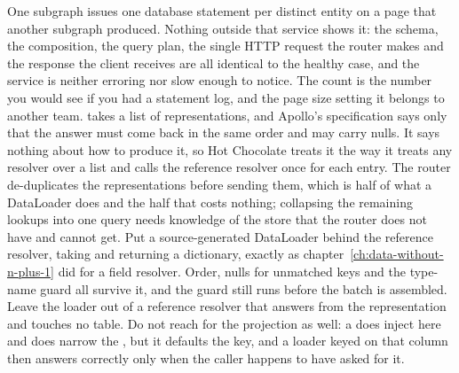 \begin{problemsummary}
{One subgraph issues one database statement per distinct entity on a page that
another subgraph produced. Nothing outside that service shows it: the schema,
the composition, the query plan, the single HTTP request the router makes and
the response the client receives are all identical to the healthy case, and the
service is neither erroring nor slow enough to notice. The count is the number
you would see if you had a statement log, and the page size setting it belongs
to another team.}
{ takes a list of representations, and Apollo's specification
says only that the answer must come back in the same order and may carry nulls.
It says nothing about how to produce it, so Hot Chocolate treats it the way it
treats any resolver over a list and calls the reference resolver once for each
entry. The router de-duplicates the representations before sending them, which
is half of what a DataLoader does and the half that costs nothing; collapsing
the remaining lookups into one query needs knowledge of the store that the
router does not have and cannot get.}
{Put a source-generated DataLoader behind the reference resolver, taking
 and returning a dictionary, exactly as
chapter~\ref{ch:data-without-n-plus-1} did for a field resolver. Order, nulls
for unmatched keys and the type-name guard all survive it, and the guard still
runs before the batch is assembled. Leave the loader out of a reference resolver
that answers from the representation and touches no table. Do not reach for the
projection as well: a  does inject here and does narrow the
, but it defaults the key, and a loader keyed on that column then
answers correctly only when the caller happens to have asked for it.}
\end{problemsummary}
